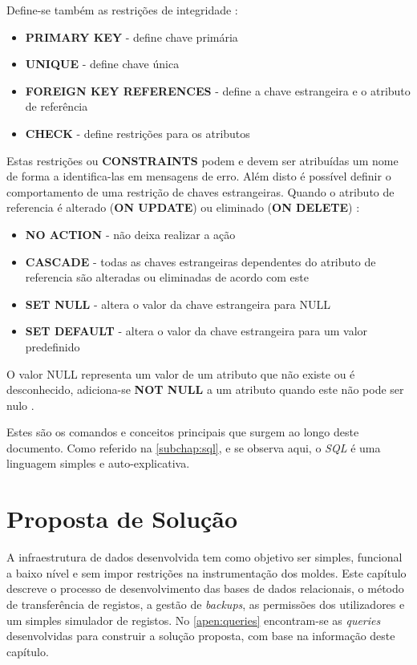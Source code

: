 \documentclass[11pt,twoside,a4paper]{report}
\begin{document}
Define-se também as restrições de integridade \cite{mysql}:
\begin{itemize}
	\item \textbf{PRIMARY KEY} - define chave primária
	\item \textbf{UNIQUE} - define chave única
	\item \textbf{FOREIGN KEY REFERENCES} - define a chave estrangeira e o atributo de referência
	\item \textbf{CHECK} - define restrições para os atributos
\end{itemize}
Estas restrições ou \textbf{CONSTRAINTS} podem e devem ser atribuídas um nome de forma a identifica-las em mensagens de erro. Além disto é possível definir o comportamento de uma restrição de chaves estrangeiras. Quando o atributo de referencia é alterado (\textbf{ON UPDATE}) ou eliminado (\textbf{ON DELETE}) \cite{mysql}:
\begin{itemize}
	\item \textbf{NO ACTION} - não deixa realizar a ação
	\item \textbf{CASCADE} - todas as chaves estrangeiras dependentes do atributo de referencia são alteradas ou eliminadas de acordo com este
	\item \textbf{SET NULL} - altera o valor da chave estrangeira para NULL
	\item \textbf{SET DEFAULT} - altera o valor da chave estrangeira para um valor predefinido
\end{itemize}
O valor NULL representa um valor de um atributo que não existe ou é desconhecido, adiciona-se \textbf{NOT NULL} a um atributo quando este não pode ser nulo \cite{mysql}.\par 
Estes são os comandos e conceitos principais que surgem ao longo deste documento. Como referido na \autoref{subchap:sql}, e se observa aqui, o \textit{SQL} é uma linguagem simples e auto-explicativa.

\cleardoublepage
\chapter{Proposta de Solução}
\label{chap:solucao}
A infraestrutura de dados desenvolvida tem como objetivo ser simples, funcional a baixo nível e sem impor restrições na instrumentação dos moldes. Este capítulo descreve o processo de desenvolvimento das bases de dados relacionais, o método de transferência de registos, a gestão de \textit{backups}, as permissões dos utilizadores e um simples simulador de registos. No \autoref{apen:queries} encontram-se as \textit{queries} desenvolvidas para construir a solução proposta, com base na informação deste capítulo.
\end{document}
